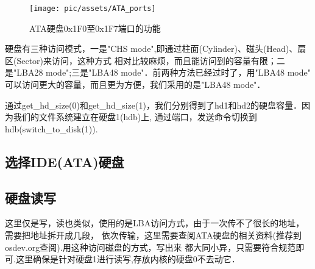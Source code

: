 \begin{figure}[!htbp]
	\centering	\texttt{[image: pic/assets/ATA\_ports]}
    \caption{ATA硬盘0x1F0至0x1F7端口的功能}	\label{ATA_ports}	\end{figure}

硬盘有三种访问模式，一是"CHS mode",即通过柱面(Cylinder)、磁头(Head)、扇区(Sector)来访问，这种方式
相对比较麻烦，而且能访问到的容量有限；二是"LBA28 mode";三是"LBA48 mode"．前两种方法已经过时了，用"LBA48 mode"
可以访问更大的容量，而且更为方便，我们采用的是"LBA48 mode"．

通过get\_hd\_size(0)和get\_hd\_size(1)，我们分别得到了hd1和hd2的硬盘容量．因为我们的文件系统建立在硬盘1(hdb)上,
通过端口，发送命令切换到hdb(switch\_to\_disk(1)).

\subsection{选择IDE(ATA)硬盘}



\subsection{硬盘读写}
这里仅是写，读也类似，使用的是LBA访问方式，由于一次传不了很长的地址，需要把地址拆开成几段，
依次传输，这里需要查阅ATA硬盘的相关资料(推荐到osdev.org查阅).用这种访问磁盘的方式，写出来
都大同小异，只需要符合规范即可.这里确保是针对硬盘1进行读写,存放内核的硬盘0不去动它．

